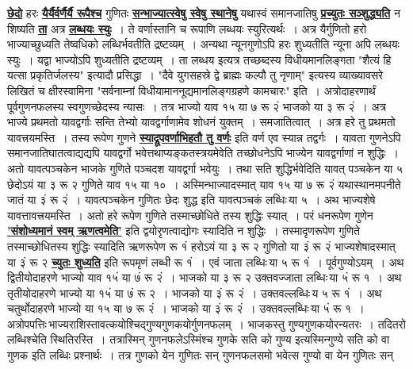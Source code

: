 \documentclass[11pt, openany]{book}
\begin{document}
\hyperref[29]{\textbf{छेदो}} हरः \hyperref[29]{\textbf{यैर्यैर्वर्णैर्यै रूपैश्च}} गुणितः \hyperref[29]{\textbf{सन्भाज्यात्स्वेषु स्वेषु स्थानेषु}} यथास्वं समानजातिषु \hyperref[29]{\textbf{प्रच्युतः सञ्शुद्ध्यति}} न शिष्यति \hyperref[29]{\textbf{ता}} अत्र \hyperref[29]{\textbf{लब्धयः स्युः}}~। ते
वर्णास्तानि च रूपाणि लब्धयः स्युरित्यर्थः~। अत्र यैर्गुणितो हरो
भाज्याच्छुध्यति तेष्वधिको लब्धिर्भवतीति द्रष्टव्यम्~। अन्यथा न्यूनगुणोऽपि हरः शुध्यतीति
न्यूना अपि लब्धयः स्युः~। यद्वा भाज्योऽपि शुध्यतीति द्रष्टव्यम्~। ता लब्धय इत्यत्र
तच्छब्दस्य विधीयमानलिङ्गता {\qt "शैत्यं हि यत्सा प्रकृतिर्जलस्य"} इत्यादौ प्रसिद्धा~। {\qt "दैवे युगसहस्रे द्वे ब्राह्मः कल्पौ तु नृणाम्"} इत्यस्य व्याख्यावसरे लिखितं च क्षीरस्वामिना
{\qt "सर्वनाम्नां विधीयामाननूद्यमानलिङ्गग्रहणे कामचारः"}  इति~।
अत्रोदाहरणार्थं पूर्वगुणनफलस्य स्वगुणच्छेदस्य न्यासः~। तत्र भाज्यो याव १५ या ७ रू २ं भाजको या ३
\newpage
\noindent रू २ं~। अत्र भाज्ये प्रथमतो यावद्वर्गाः सन्ति तेभ्यो यावद्वर्गाणामेव
शोधनं युक्तम्~।
समजातित्वात्~। अत्र हरे तु प्रथमतो यावत्त्रयमस्ति~। तस्य रूपेण गुणने
\hyperref[26]{\textbf{स्याद्रूपवर्णाभिहतौ तु वर्णः}} इति वर्ण एव स्यान्न तद्वर्गः~। यावता गुणनेऽपि
समानजातिघातत्वाद्यद्यपि यावद्वर्गो भवेत्तथाप्यङ्कतस्त्रयमेवेति तच्छोधनेऽपि भाज्येन
यावद्वर्गाणां न शुद्धिः~। अतो यावत्पञ्चकेन भाजके गुणिते पञ्चदश यावद्वर्गा भवेयुः~। तथा सति
शुद्धिर्भवेदिति यावत् पञ्चकेन या ५ छेदोऽयं या ३ रू २ गुणिते याव १५ या १०~।
अस्मिन्भाज्यादस्मात् याव १५ या ७ रू २ं यथास्थानमपनीते जातं या ३ं रू २ं~। यावत्पञ्चकेन गुणितः छेदः शुद्ध इति यावत्पञ्चकं लब्धिः\textendash \,या ५~। अथ
भाज्यशेषे यावत्तावत्त्रयमस्ति~। अतो हरे रूपेण गुणिते तस्माच्छोधिते तस्य शुद्धिः
स्यात्~। परं धनरूपेण गुणेन \hyperref[7]{\textbf{'संशोध्यमानं स्वम् ऋणत्वमेति'}} इति द्वयोरृणत्वाद्योगः
स्यादिति न शुद्धिः~। तस्मादृणरूपेण गुणिते तस्माच्छोधितस्य शुद्धिः स्यादिति ऋणरूपेण रू १ं हरोऽयं या ३ रू २ गुणितो या ३ं रू २ं भाज्यशेषादस्मात् या ३ं रू २ \hyperref[29]{\textbf{च्युतः शुध्यति}} इति रूपमृणं लब्धी रू १ं~। एवं जाता लब्धिः\textendash \,या ५ रू १ं~।
पूर्वगुण्योऽयम्~। अथ द्वितीयोदाहरणे भाज्यो याव १५ं या ७ं रू २ं~। भाजको या ३
रू २ उक्तवज्जाता लब्धिः\textendash \,या ५ं रू १~। अथ तृतीयोदाहरणे भाज्यो या १५ं या
७ं रू २~। भाजको या ३ं रू २ं~। उक्तवल्लब्धिः\textendash \,य ५ रू १ं~। अथ
चतुर्थोदाहरणे भाज्यो या १५ या ७ रू २ं~। भाजको या ३ं रू २ं~। उक्तवल्लब्धिः\textendash \,या ५ं रू
१~। अत्रोपपत्तिः\textendash \,भाज्यराशिस्तावत्कयोश्चिद्गुण्यगुणकयोर्गुणनफलम्~।
भाजकस्तु गुण्यगुणकयोरन्यतरः~। तदितरो लब्धिश्चेति स्थितिरस्ति~।
तत्रास्मिन् गुणनफलेऽस्मिंश्च गुणके सति को गुण्य इत्यस्मिन्गुण्ये सति को वा गुणक इति लब्धिः
प्रश्नार्थः~। तत्र गुणको येन गुणितः सन् गुणनफलसमो भवेत्स गुण्यो वा येन गुणितः सन्
\end{document}
